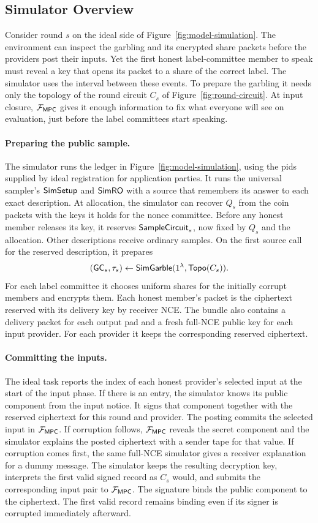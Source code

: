 \subsection{Simulator Overview}
\label{sec:simulator}

Consider round $s$ on the ideal side of Figure~\ref{fig:model-simulation}.
The environment can inspect the garbling and its encrypted share packets
before the providers post their inputs.  Yet the first honest
label-committee member to speak must reveal a key that opens its packet to a
share of the correct label.  The simulator uses the interval between
these events.  To prepare the garbling it needs only the topology of the
round circuit $C_s$ of Figure~\ref{fig:round-circuit}.  At input closure,
$\mathcal F_{\mathsf{MPC}}$ gives it enough information to fix what everyone will see on
evaluation, just before the label committees start speaking.

\paragraph{Preparing the public sample.}
The simulator runs the ledger in Figure~\ref{fig:model-simulation},
using the pids supplied by ideal registration for application parties.
It runs the universal sampler's $\mathsf{SimSetup}$ and $\mathsf{SimRO}$ with a source
that remembers its answer to each exact description.  At allocation,
the simulator can recover $Q_s$ from the coin packets with the keys
it holds for the nonce committee.  Before any honest member releases
its key, it reserves $\mathsf{SampleCircuit}_s$, now fixed by $Q_s$ and the
allocation.  Other descriptions receive ordinary samples.  On the
first source call for the reserved description, it prepares
\[
   (\mathsf{GC}_s,\tau_s)\mathrel{\leftarrow}\mathsf{SimGarble}(1^\lambda,\mathsf{Topo}(C_s)).
\]
For each label committee it chooses uniform shares for the initially
corrupt members and encrypts them.  Each honest member's packet is
the ciphertext reserved with its delivery key by receiver NCE.  The
bundle also contains a delivery packet for each output pad and a fresh full-NCE public key for each input provider.
For each provider it keeps the corresponding reserved ciphertext.

\paragraph{Committing the inputs.}
The ideal task reports the index of each honest provider's selected
input at the start of the input phase.  If there is an entry, the
simulator knows its public component from the input notice.  It signs
that component together with the reserved ciphertext for this round
and provider.  The posting commits the selected input in $\mathcal F_{\mathsf{MPC}}$.  If corruption follows, $\mathcal F_{\mathsf{MPC}}$
reveals the secret component and the simulator explains the posted
ciphertext with a sender tape for that value.  If corruption comes
first, the same full-NCE simulator gives a receiver explanation for
a dummy message.  The simulator keeps the resulting decryption key,
interprets the first valid signed record as $C_s$ would, and submits
the corresponding input pair to $\mathcal F_{\mathsf{MPC}}$.  The signature binds the public component to the ciphertext.  The
first valid record remains binding even if its signer is corrupted
immediately afterward.

